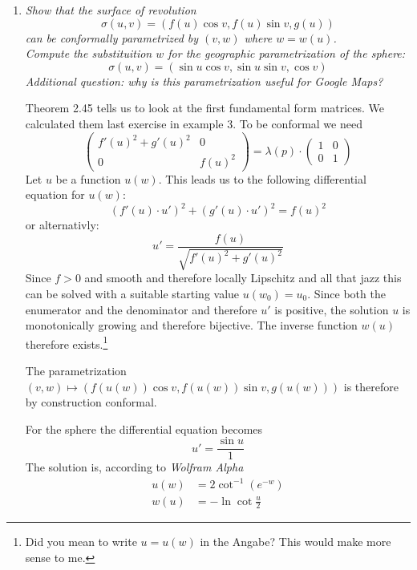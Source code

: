 \documentclass[a4paper,11pt,notitlepage,fullpage]{article}
\begin{document}
\begin{enumerate}
\item \emph{Show that the surface of revolution}
\begin{equation*}
\sigma(u,v) = (f(u) \cos v, f(u) \sin v, g(u))
\end{equation*}
\emph{can be conformally parametrized by $(v,w)$ where $w = w(u)$. \\ Compute the substituition $w$ for the geographic parametrization of the sphere:}
\begin{equation*}
\sigma(u,v) = (\sin u \cos v, \sin u \sin v, \cos v)
\end{equation*}
\emph{Additional question: why is this parametrization useful for Google Maps?}

Theorem 2.45 tells us to look at the first fundamental form matrices. We calculated them last exercise in example 3. To be conformal we need
\begin{equation*}
\left(\begin{matrix}
f'(u)^2 + g'(u)^2 & 0 \\
0 & f(u)^2
\end{matrix}\right) = \lambda(p) \cdot \left(\begin{matrix} 1 & 0 \\ 0 & 1 \end{matrix}\right)
\end{equation*}
Let $u$ be a function $u(w)$. This leads us to the following differential equation for $u(w)$:
\begin{equation*}
\left(f'(u)\cdot u'\right)^2 + \left(g'(u)\cdot u'\right)^2 = f(u)^2
\end{equation*}
or alternativly:
\begin{equation*}
u' = \frac{f\left(u\right)}{\sqrt{f'\left(u\right)^2 + g'\left(u\right)^2}}
\end{equation*}
Since $f > 0$ and smooth and therefore locally Lipschitz and all that jazz this can be solved with a suitable starting value $u(w_0) = u_0$. Since both the enumerator and the denominator and therefore $u'$ is positive, the solution $u$ is monotonically growing and therefore bijective. The inverse function $w(u)$ therefore exists.\footnote{Did you mean to write $u = u(w)$ in the Angabe? This would make more sense to me.}

The parametrization $(v, w) \mapsto (f(u(w)) \cos v, f(u(w)) \sin v, g(u(w)))$ is therefore by construction conformal.

For the sphere the differential equation becomes
\begin{equation*}
u' = \frac{\sin u}{1}
\end{equation*}
The solution is, according to \emph{Wolfram Alpha}
\begin{align*}
u(w) &= 2 \cot^{-1}\left(e^{-w}\right) \\
w(u) &= -\ln\cot\frac{u}{2}
\end{align*}






\end{enumerate}
\end{document}
